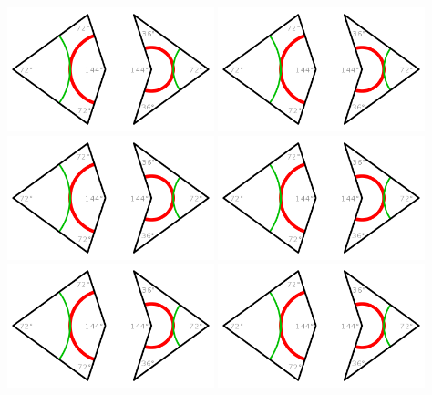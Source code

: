 \documentclass{zusammenfassung}
\begin{document}
\pagebreak
{}
\includegraphics[width=0.45\textwidth]{penrose_kite_dart.png}
\includegraphics[width=0.45\textwidth]{penrose_kite_dart.png}\\[0.2cm]
\includegraphics[width=0.45\textwidth]{penrose_kite_dart.png}
\includegraphics[width=0.45\textwidth]{penrose_kite_dart.png}\\[0.2cm]
\includegraphics[width=0.45\textwidth]{penrose_kite_dart.png}
\includegraphics[width=0.45\textwidth]{penrose_kite_dart.png}\\[0.2cm]
\end{document}
